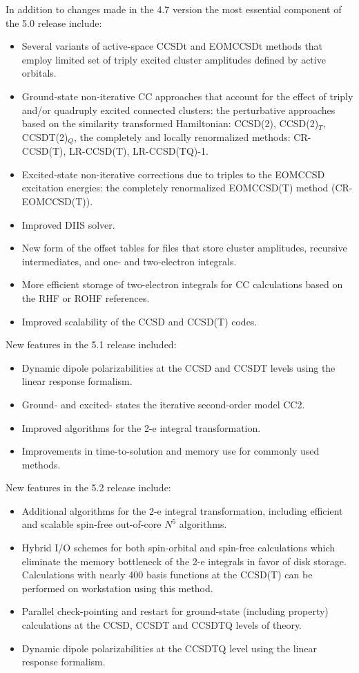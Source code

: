 In addition to changes made in the 4.7 version the most essential component of the 5.0 release 
include:

\begin{itemize}
\item Several variants of active-space CCSDt and EOMCCSDt methods that employ limited set of triply 
excited cluster amplitudes defined by active orbitals.
\item  Ground-state non-iterative CC approaches that account for the effect of triply and/or
quadruply excited connected clusters: the perturbative approaches based on the similarity 
transformed Hamiltonian: CCSD(2), CCSD(2)$_T$, CCSDT(2)$_Q$, the completely and locally renormalized 
methods: CR-CCSD(T), LR-CCSD(T), LR-CCSD(TQ)-1.
\item Excited-state non-iterative corrections due to triples to the EOMCCSD excitation energies:
the completely renormalized EOMCCSD(T) method (CR-EOMCCSD(T)).
\item Improved DIIS solver.
\item New form of the offset tables for files that store cluster amplitudes, recursive intermediates, and one- and two-electron integrals.
\item More efficient storage of two-electron integrals for CC calculations based on the RHF or ROHF references.
\item Improved scalability of the CCSD and CCSD(T) codes.
\end{itemize} 

New features in the 5.1 release included:
\begin{itemize}
\item Dynamic dipole polarizabilities at the CCSD and CCSDT levels using the linear response formalism.
\item Ground- and excited- states the iterative second-order model CC2.
\item Improved algorithms for the 2-e integral transformation.
\item Improvements in time-to-solution and memory use for commonly used methods.
\end{itemize} 

New features in the 5.2 release include:
\begin{itemize}
\item Additional algorithms for the 2-e integral transformation, including efficient and scalable spin-free out-of-core $N^5$ algorithms.
\item Hybrid I/O schemes for both spin-orbital and spin-free calculations which eliminate the memory bottleneck of the 2-e integrals 
in favor of disk storage.  Calculations with nearly 400 basis functions at the CCSD(T) can be performed on workstation using this method.
\item Parallel check-pointing and restart for ground-state (including property) calculations at the CCSD, CCSDT and CCSDTQ levels of theory.
\item Dynamic dipole polarizabilities at the CCSDTQ level using the linear response formalism.
\end{itemize} 

